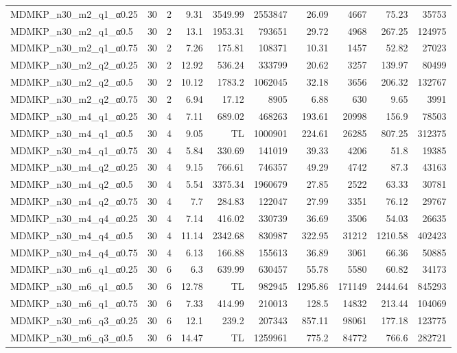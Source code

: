 \begin{center}
\begin{scriptsize}
\begin{longtable}{lrrrrrrrrr}
MDMKP\_n30\_m2\_q1\_α0.25 & 30 & 2 & 9.31 & 3549.99 & 2553847 & 26.09 & 4667 & 75.23 & 35753\\
MDMKP\_n30\_m2\_q1\_α0.5 & 30 & 2 & 13.1 & 1953.31 & 793651 & 29.72 & 4968 & 267.25 & 124975\\
MDMKP\_n30\_m2\_q1\_α0.75 & 30 & 2 & 7.26 & 175.81 & 108371 & 10.31 & 1457 & 52.82 & 27023\\
MDMKP\_n30\_m2\_q2\_α0.25 & 30 & 2 & 12.92 & 536.24 & 333799 & 20.62 & 3257 & 139.97 & 80499\\
MDMKP\_n30\_m2\_q2\_α0.5 & 30 & 2 & 10.12 & 1783.2 & 1062045 & 32.18 & 3656 & 206.32 & 132767\\
MDMKP\_n30\_m2\_q2\_α0.75 & 30 & 2 & 6.94 & 17.12 & 8905 & 6.88 & 630 & 9.65 & 3991\\
MDMKP\_n30\_m4\_q1\_α0.25 & 30 & 4 & 7.11 & 689.02 & 468263 & 193.61 & 20998 & 156.9 & 78503\\
MDMKP\_n30\_m4\_q1\_α0.5 & 30 & 4 & 9.05 &  TL & 1000901 & 224.61 & 26285 & 807.25 & 312375\\
MDMKP\_n30\_m4\_q1\_α0.75 & 30 & 4 & 5.84 & 330.69 & 141019 & 39.33 & 4206 & 51.8 & 19385\\
MDMKP\_n30\_m4\_q2\_α0.25 & 30 & 4 & 9.15 & 766.61 & 746357 & 49.29 & 4742 & 87.3 & 43163\\
MDMKP\_n30\_m4\_q2\_α0.5 & 30 & 4 & 5.54 & 3375.34 & 1960679 & 27.85 & 2522 & 63.33 & 30781\\
MDMKP\_n30\_m4\_q2\_α0.75 & 30 & 4 & 7.7 & 284.83 & 122047 & 27.99 & 3351 & 76.12 & 29767\\
MDMKP\_n30\_m4\_q4\_α0.25 & 30 & 4 & 7.14 & 416.02 & 330739 & 36.69 & 3506 & 54.03 & 26635\\
MDMKP\_n30\_m4\_q4\_α0.5 & 30 & 4 & 11.14 & 2342.68 & 830987 & 322.95 & 31212 & 1210.58 & 402423\\
MDMKP\_n30\_m4\_q4\_α0.75 & 30 & 4 & 6.13 & 166.88 & 155613 & 36.89 & 3061 & 66.36 & 50885\\
MDMKP\_n30\_m6\_q1\_α0.25 & 30 & 6 & 6.3 & 639.99 & 630457 & 55.78 & 5580 & 60.82 & 34173\\
MDMKP\_n30\_m6\_q1\_α0.5 & 30 & 6 & 12.78 &  TL & 982945 & 1295.86 & 171149 & 2444.64 & 845293\\
MDMKP\_n30\_m6\_q1\_α0.75 & 30 & 6 & 7.33 & 414.99 & 210013 & 128.5 & 14832 & 213.44 & 104069\\
MDMKP\_n30\_m6\_q3\_α0.25 & 30 & 6 & 12.1 & 239.2 & 207343 & 857.11 & 98061 & 177.18 & 123775\\
MDMKP\_n30\_m6\_q3\_α0.5 & 30 & 6 & 14.47 &  TL & 1259961 & 775.2 & 84772 & 766.6 & 282721\\

\end{longtable}
\end{scriptsize}
\end{center}
